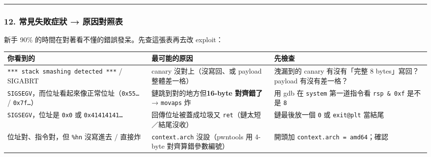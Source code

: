 \documentclass[10pt,a4paper]{article}
\newcounter{none}
\begin{document}
\begin{center}\rule{0.5\linewidth}{0.5pt}\end{center}

\subsubsection{12. 常見失敗症狀 →
原因對照表}\label{ux5e38ux898bux5931ux6557ux75c7ux72c0-ux539fux56e0ux5c0dux7167ux8868}

新手 90\% 的時間在對著看不懂的錯誤發呆。先查這張表再去改 exploit：

{\def\LTcaptype{none} %
\begin{longtable}[]{@{}
  >{\raggedright\arraybackslash}p{}
  >{\raggedright\arraybackslash}p{}
  >{\raggedright\arraybackslash}p{}@{}}
\toprule\noalign{}
\begin{minipage}[b]{\linewidth}\raggedright
你看到的
\end{minipage} & \begin{minipage}[b]{\linewidth}\raggedright
最可能的原因
\end{minipage} & \begin{minipage}[b]{\linewidth}\raggedright
先檢查
\end{minipage} \\
\midrule\noalign{}
\endhead
\bottomrule\noalign{}
\endlastfoot
\texttt{***\ \allowbreak{}stack\ \allowbreak{}smashing\ \allowbreak{}detected\ \allowbreak{}***} / SIGABRT & canary
沒對上（沒寫回、或 payload 整體差一格） & 洩漏到的 canary 有沒有「完整 8
bytes」寫回？payload 有沒有差一格？ \\
\texttt{SIGSEGV}，而位址看起來像正常位址（\texttt{0x55…} /
\texttt{0x7f…}） & 鏈跳到對的地方但\textbf{16-byte 對齊錯了} →
\texttt{movaps} 炸 & 用 gdb 在 \texttt{system} 第一道指令看
\texttt{rsp\ \allowbreak{}\&\allowbreak{}\ \allowbreak{}0xf} 是不是 \texttt{8} \\
\texttt{SIGSEGV}，位址是 \texttt{0x0} 或 \texttt{0x41414141…} &
回傳位址被蓋成垃圾又 \texttt{ret}（鏈太短／結尾沒收） & 鏈最後放一個
\texttt{0} 或 \texttt{exit@plt} 當結尾 \\
位址對、指令對，但 \texttt{\%\allowbreak{}hn} 沒寫進去 / 直接炸 &
\texttt{context.\allowbreak{}arch} 沒設（pwntools 用 4-byte 對齊算錯參數編號） &
開頭加
\texttt{context.\allowbreak{}arch\ \allowbreak{}=\ \allowbreak{}\textquotesingle{}\allowbreak{}amd64\textquotesingle{}\allowbreak{}}；確認

\end{longtable}}
\end{document}
